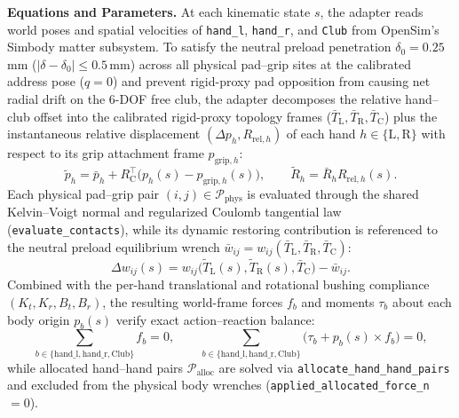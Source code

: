 \documentclass[11pt,a4paper]{article}
\begin{document}
\textbf{Equations and Parameters.}
At each kinematic state $s$, the adapter reads world poses and spatial velocities of \texttt{hand\_l},
\texttt{hand\_r}, and \texttt{Club} from OpenSim's Simbody matter subsystem. To satisfy the neutral
preload penetration $\delta_0 = 0.25$\,mm ($|\delta - \delta_0| \le 0.5$\,mm) across all physical
pad--grip sites at the calibrated address pose ($q = 0$) and prevent rigid-proxy pad opposition from
causing net radial drift on the 6-DOF free club, the adapter decomposes the relative hand--club offset
into the calibrated rigid-proxy topology frames ($\bar{T}_{\mathrm{L}}, \bar{T}_{\mathrm{R}}, \bar{T}_{\mathrm{C}}$)
plus the instantaneous relative displacement $(\Delta p_h, R_{\mathrm{rel},h})$ of each hand $h \in \{\mathrm{L}, \mathrm{R}\}$
with respect to its grip attachment frame $p_{\mathrm{grip},h}$:
\begin{equation}
\tilde{p}_h = \bar{p}_h + R_{\mathrm{C}}^\top \bigl(p_h(s) - p_{\mathrm{grip},h}(s)\bigr), \qquad
\tilde{R}_h = \bar{R}_h R_{\mathrm{rel},h}(s).
\end{equation}
Each physical pad--grip pair $(i, j) \in \mathcal{P}_{\mathrm{phys}}$ is evaluated through the shared
Kelvin--Voigt normal and regularized Coulomb tangential law (\texttt{evaluate\_contacts}), while its
dynamic restoring contribution is referenced to the neutral preload equilibrium wrench
$\bar{w}_{ij} = w_{ij}(\bar{T}_{\mathrm{L}}, \bar{T}_{\mathrm{R}}, \bar{T}_{\mathrm{C}})$:
\begin{equation}
\Delta w_{ij}(s) = w_{ij}\bigl(\tilde{T}_{\mathrm{L}}(s), \tilde{T}_{\mathrm{R}}(s), \bar{T}_{\mathrm{C}}\bigr) - \bar{w}_{ij}.
\end{equation}
Combined with the per-hand translational and rotational bushing compliance $(K_t, K_r, B_t, B_r)$, the
resulting world-frame forces $f_b$ and moments $\tau_b$ about each body origin $p_b(s)$ verify exact
action--reaction balance:
\begin{equation}
\sum_{b \in \{\mathrm{hand\_l}, \mathrm{hand\_r}, \mathrm{Club}\}} f_b = 0, \qquad
\sum_{b \in \{\mathrm{hand\_l}, \mathrm{hand\_r}, \mathrm{Club}\}} \bigl(\tau_b + p_b(s) \times f_b\bigr) = 0,
\end{equation}
while allocated hand--hand pairs $\mathcal{P}_{\mathrm{alloc}}$ are solved via \texttt{allocate\_hand\_hand\_pairs}
and excluded from the physical body wrenches (\texttt{applied\_allocated\_force\_n} $= 0$).
\end{document}
